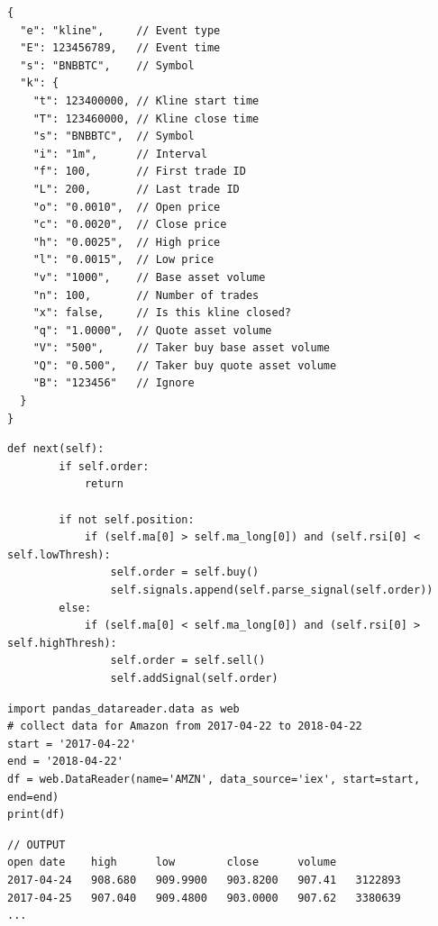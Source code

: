 \begin{code}
\label{code:impl:info_comm:bin_exch:ws_format}
\begin{verbatim}
{
  "e": "kline",     // Event type
  "E": 123456789,   // Event time
  "s": "BNBBTC",    // Symbol
  "k": {
    "t": 123400000, // Kline start time
    "T": 123460000, // Kline close time
    "s": "BNBBTC",  // Symbol
    "i": "1m",      // Interval
    "f": 100,       // First trade ID
    "L": 200,       // Last trade ID
    "o": "0.0010",  // Open price
    "c": "0.0020",  // Close price
    "h": "0.0025",  // High price
    "l": "0.0015",  // Low price
    "v": "1000",    // Base asset volume
    "n": 100,       // Number of trades
    "x": false,     // Is this kline closed?
    "q": "1.0000",  // Quote asset volume
    "V": "500",     // Taker buy base asset volume
    "Q": "0.500",   // Taker buy quote asset volume
    "B": "123456"   // Ignore
  }
}
\end{verbatim}
\end{code}


\begin{code}
\label{code:impl:bot_process:sma_rsi}
\begin{verbatim}
def next(self):
        if self.order:
            return
        
        if not self.position:
            if (self.ma[0] > self.ma_long[0]) and (self.rsi[0] < self.lowThresh):
                self.order = self.buy()
                self.signals.append(self.parse_signal(self.order))
        else:
            if (self.ma[0] < self.ma_long[0]) and (self.rsi[0] > self.highThresh):
                self.order = self.sell()
                self.addSignal(self.order)
\end{verbatim}
\end{code}


\begin{code}
\label{code:rel:dev_lib:pandas:amz_data}
\begin{verbatim}
import pandas_datareader.data as web
# collect data for Amazon from 2017-04-22 to 2018-04-22
start = '2017-04-22'
end = '2018-04-22'
df = web.DataReader(name='AMZN', data_source='iex', start=start, end=end)
print(df)
\end{verbatim}
\begin{verbatim}
// OUTPUT
open date    high      low        close      volume
2017-04-24   908.680   909.9900   903.8200   907.41   3122893
2017-04-25   907.040   909.4800   903.0000   907.62   3380639
...
\end{verbatim}
\end{code}

